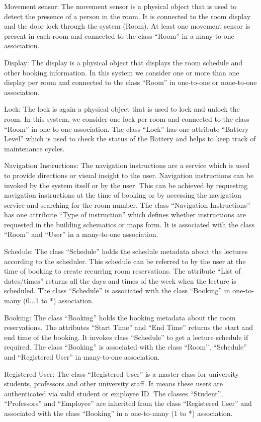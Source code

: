\documentclass[conference,onecolumn]{IEEEtran}
\begin{document}
		Movement sensor: The movement sensor is a physical object that is used to detect the presence of a person in the room. It is connected to the room display and the door lock through the system (Room). At least one movement sensor is present in each room and connected to the class ``Room'' in a many-to-one association.
		
		Display: The display is a physical object that displays the room schedule and other booking information. In this system we consider one or more than one display per room and connected to the class ``Room'' in one-to-one or none-to-one association.

		Lock: The lock is again a physical object that is used to lock and unlock the room. In this system, we consider one lock per room and connected to the class ``Room'' in one-to-one association. The class ``Lock'' has one attribute ``Battery Level'' which is used to check the status of the Battery and helps to keep track of maintenance cycles.

		Navigation Instructions: The navigation instructions are a service which is used to provide directions or visual insight to the user. Navigation instructions can be invoked by the system itself or by the user. This can be achieved by requesting navigation instructions at the time of booking or by accessing the navigation service and searching for the room number. The class ``Navigation Instructions'' has one attribute ``Type of instruction'' which defines whether instructions are requested in the building schematics or maps form. It is associated with the class ``Room'' and ``User'' in a many-to-one association.

		Schedule: The class ``Schedule'' holds the schedule metadata about the lectures according to the scheduler. This schedule can be referred to by the user at the time of booking to create recurring room reservations. The attribute ``List of dates/times'' returns all the days and times of the week when the lecture is scheduled. The class ``Schedule'' is associated with the class ``Booking'' in one-to-many (0...1 to *) association.

		Booking: The class ``Booking'' holds the booking metadata about the room reservations. The attributes ``Start Time'' and ``End Time'' returns the start and end time of the booking. It invokes class ``Schedule'' to get a lecture schedule if required. The class ``Booking'' is associated with the class ``Room'', ``Schedule'' and ``Registered User'' in many-to-one association.

		Registered User: The class ``Registered User'' is a master class for university students, professors and other university staff. It means these users are authenticated via valid student or employee ID. The classes ``Student'', ``Professors'' and ``Employee'' are inherited from the class ``Registered User'' and associated with the class ``Booking'' in a one-to-many (1 to *) association.
\end{document}
